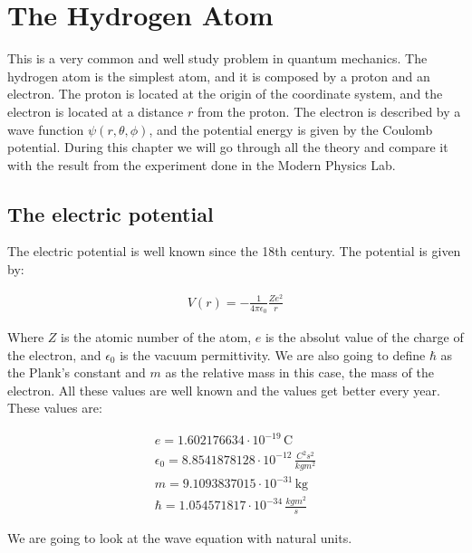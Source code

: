 \setchapterpreamble[u]{\margintoc}
\chapter{The Hydrogen Atom}

This is a very common and well study problem in quantum mechanics. The hydrogen atom is the simplest atom, and it is composed by a proton and an electron. The proton is located at the origin of the coordinate system, and the electron is located at a distance $r$ from the proton. The electron is described by a wave function $\psi(r,\theta,\phi)$, and the potential energy is given by the Coulomb potential. During this chapter we will go through all the theory and compare it with the result from the experiment done in the Modern Physics Lab.


\section{The electric potential}

The electric potential is well known since the 18th century. The potential is given by:

\begin{equation}
  \label{10.1}
  \begin{array}{c}
    V(r) = -\frac{1}{4\pi\epsilon_0}\frac{Ze^2}{r}
  \end{array}
\end{equation}

Where $Z$ is the atomic number of the atom, $e$ is the absolut value of the charge of the electron, and $\epsilon_0$ is the vacuum permittivity. We are also going to define $\hbar$ as the Plank's constant and $m$ as the relative mass in this case, the mass of the electron. All these values are well known and the values get better every year. These values are:

\begin{equation}
  \begin{array}{c}
    e = 1.602176634 \cdot 10^{-19} \, \text{C} \\
    \epsilon_0 = 8.8541878128 \cdot 10^{-12} \, \frac{C^2 s^2}{kg m^2} \\
    m = 9.1093837015 \cdot 10^{-31} \, \text{kg}\\
    \hbar = 1.054571817 \cdot 10^{-34} \, \frac{kg m^2}{s}
  \end{array}
\end{equation}

We are going to look at the wave equation with natural units.

